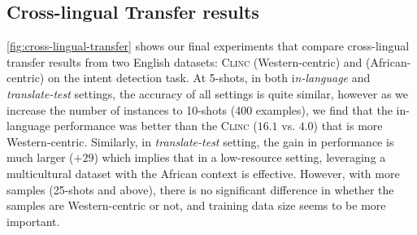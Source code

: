 \subsection{Cross-lingual Transfer results}
\autoref{fig:cross-lingual-transfer} shows our final experiments that compare cross-lingual transfer results from two English datasets: \textsc{Clinc} (Western-centric) and \dataset{} (African-centric) on the intent detection task. At 5-shots, in both i\textit{n-language} and \textit{translate-test} settings, the accuracy of all settings is quite similar, however as we increase the number of instances to 10-shots (400 examples), we find that the \dataset{} in-language performance was better than the \textsc{Clinc} ($16.1$ vs. $4.0$) that is more Western-centric. Similarly, in \textit{translate-test} setting, the gain in performance is much larger ($+29$)  which implies that in a low-resource setting, leveraging a multicultural dataset with the African context is effective. However, with more samples (25-shots and above), there is no significant difference in whether the samples are Western-centric or not, and training data size seems to be more important. 



    




